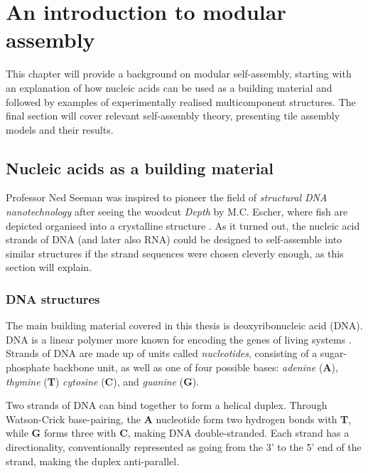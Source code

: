 
\chapter{An introduction to modular assembly}
\label{ch:polycubes_intro}

\minitoc

This chapter will provide a background on modular self-assembly, starting with an explanation of how nucleic acids can be used as a building material and followed by examples of experimentally realised multicomponent structures. The final section will cover relevant self-assembly theory, presenting tile assembly models and their results.


\section{Nucleic acids as a building material}
Professor Ned Seeman was inspired to pioneer the field of \emph{structural DNA nanotechnology} after seeing the woodcut \emph{Depth} by M.C. Escher, where fish are depicted organised into a crystalline structure \cite{seeman_2016}. As it turned out, the nucleic acid strands of DNA (and later also RNA) could be designed to self-assemble into similar structures if the strand sequences were chosen cleverly enough, as this section will explain.

\subsection{DNA structures}

The main building material covered in this thesis is deoxyribonucleic acid (DNA). DNA is a linear polymer more known for encoding the genes of living systems \cite{calladine1997understanding}. Strands of DNA are made up of units called \emph{nucleotides}, consisting of a sugar-phosphate backbone unit, as well as one of four possible bases: \emph{adenine} (\textbf{A}), \emph{thymine} (\textbf{T}) \emph{cytosine} (\textbf{C}), and \emph{guanine} (\textbf{G}). 

Two strands of DNA can bind together to form a helical duplex. Through Watson-Crick base-pairing, the \textbf{A} nucleotide form two hydrogen bonds with \textbf{T}, while \textbf{G} forms three with \textbf{C}, making DNA double-stranded. Each strand has a directionality, conventionally represented as going from the 3' to the 5' end of the strand, making the duplex anti-parallel.

